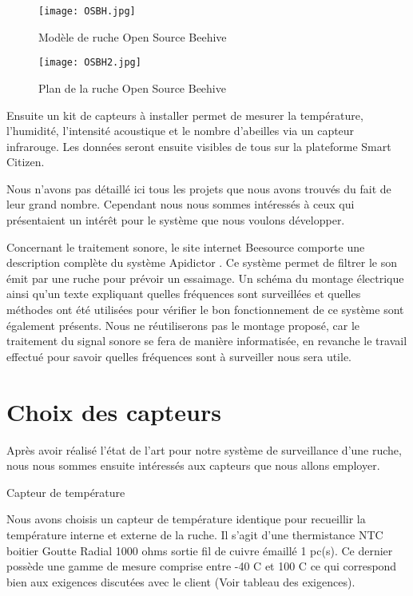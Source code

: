 \begin{figure}[h]
\centering\texttt{[image: OSBH.jpg]}
\caption{\label{fig:OSBH} Modèle de ruche Open Source Beehive}
\end{figure}

\begin{figure}[h]
\centering\texttt{[image: OSBH2.jpg]}
\caption{\label{fig:OSBH2} Plan de la ruche Open Source Beehive}
\end{figure}

Ensuite un kit de capteurs à installer permet de mesurer la température, l'humidité, l'intensité acoustique et le nombre d'abeilles via un capteur infrarouge. Les données seront ensuite visibles de tous sur la plateforme Smart Citizen.

Nous n'avons pas détaillé ici tous les projets que nous avons trouvés du fait de leur grand nombre. Cependant nous nous sommes intéressés à ceux qui présentaient un intérêt pour le système que nous voulons développer. 

Concernant le traitement sonore, le site internet Beesource comporte une description complète du système Apidictor \cite{apidictor}. Ce système permet de filtrer le son émit par une ruche pour prévoir un essaimage. Un schéma du montage électrique ainsi qu'un texte expliquant quelles fréquences sont surveillées et quelles méthodes ont été utilisées pour vérifier le bon fonctionnement de ce système sont également présents. Nous ne réutiliserons pas le montage proposé, car le traitement du signal sonore se fera de manière informatisée, en revanche le travail effectué pour savoir quelles fréquences sont à surveiller nous sera utile.

\section{Choix des capteurs}

Après avoir réalisé l'état de l'art pour notre système de surveillance d'une ruche, nous nous sommes ensuite intéressés aux capteurs que nous allons employer.

Capteur de température

Nous avons choisis un capteur de température identique pour recueillir la température interne et externe de la ruche.
Il s'agit d'une thermistance NTC boitier Goutte Radial 1000 ohms sortie fil de cuivre émaillé 1 pc(s). Ce dernier possède une gamme de mesure comprise entre -40 C et 100 C ce qui correspond bien aux exigences discutées avec le client (Voir tableau des exigences).

